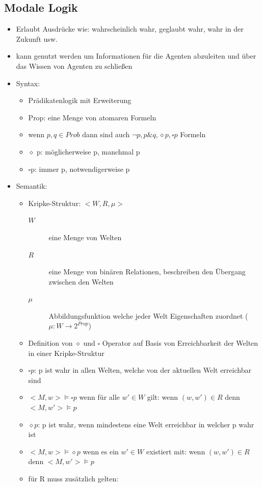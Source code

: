 \documentclass{article} %
\begin{document}
	\subsection{Modale Logik}
	\begin{itemize}
		\item Erlaubt Ausdrücke wie: wahrscheinlich wahr, geglaubt wahr, wahr in der Zukunft usw.
		\item kann genutzt werden um Informationen für die Agenten abzuleiten und über das Wissen von Agenten zu schließen
		\item Syntax:
		\begin{itemize}
			\item Prädikatenlogik mit Erweiterung
			\item Prop: eine Menge von atomaren Formeln
			\item wenn $p,q \in Prob$ dann sind auch $\neg p, p \& q, \diamond p,\square p$ Formeln
			\item $\diamond$ p: möglicherweise p, manchmal p 
			\item $\square$p: immer p, notwendigerweise p
		\end{itemize}
		\item Semantik:
		\begin{itemize}
			\item Kripke-Struktur: $<W,R,\mu>$
			\begin{description}
				\item[$W$] eine Menge von Welten
				\item[$R$] eine Menge von binären Relationen, beschreiben den Übergang zwischen den Welten
				\item[$\mu$] Abbildungsfunktion welche jeder Welt Eigenschaften zuordnet ($\mu : W \rightarrow 2^{Prop}$)
			\end{description}
			\item Definition von $\diamond$ und $\square$ Operator auf Basis von Erreichbarkeit der Welten in einer Kripke-Struktur
			\item $\square p$: p ist wahr in allen Welten, welche von der aktuellen Welt erreichbar sind
			\item $<M,w>\vDash\square p$ wenn für alle $w' \in W$ gilt: wenn $(w,w') \in R$ denn $<M,w'>\vDash p$
			\item $\diamond p$: p ist wahr, wenn mindestens eine Welt erreichbar in welcher p wahr ist
			\item $<M,w>\vDash\diamond p$ wenn es ein $w' \in W$ existiert mit:  wenn $(w,w') \in R$ denn $<M,w'>\vDash p$
			\item für R muss zusätzlich gelten:

\end{itemize}
\end{itemize}
\end{document}
